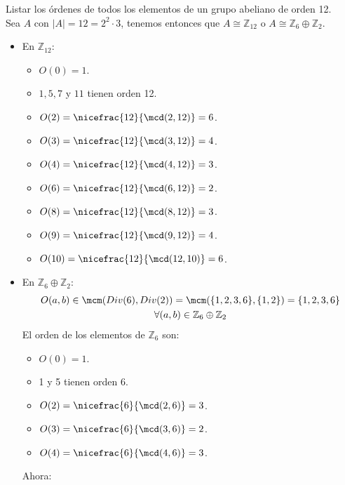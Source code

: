 \begin{ejemplo}
    Listar los órdenes de todos los elementos de un grupo abeliano de orden 12.\\

    \noindent
    Sea $A$ con $|A| = 12 = 2^2\cdot 3$, tenemos entonces que $A\cong \mathbb{Z}_{12}$ o $A\cong \mathbb{Z}_6\oplus \mathbb{Z}_2$.
    \begin{itemize}
        \item En $\mathbb{Z}_{12}$:
            \begin{itemize}
                \item $O(0) = 1$.
                \item $1, 5, 7$ y $11$ tienen orden 12.
                \item $O(2) = \nicefrac{12}{\mcd(2,12)} = 6$.
                \item $O(3) = \nicefrac{12}{\mcd(3,12)} = 4$.
                \item $O(4) = \nicefrac{12}{\mcd(4,12)} = 3$.
                \item $O(6) = \nicefrac{12}{\mcd(6,12)} = 2$.
                \item $O(8) = \nicefrac{12}{\mcd(8,12)} = 3$.
                \item $O(9) = \nicefrac{12}{\mcd(9,12)} = 4$.
                \item $O(10) = \nicefrac{12}{\mcd(12,10)} = 6$.
            \end{itemize}
        \item En $\mathbb{Z}_6\oplus\mathbb{Z}_2$:
            \begin{multline*}
                O(a,b) \in  \mcm(Div(6), Div(2)) = \mcm(\{1,2,3,6\}, \{1,2\}) = \{1,2,3,6\} \\ \forall (a,b)\in \mathbb{Z}_6\oplus\mathbb{Z}_2
            \end{multline*}
            El orden de los elementos de $\mathbb{Z}_6$ son:
            \begin{itemize}
                \item $O(0) = 1$.
                \item 1 y 5 tienen orden 6.
                \item $O(2) = \nicefrac{6}{\mcd(2,6)} = 3$.
                \item $O(3) = \nicefrac{6}{\mcd(3,6)} = 2$.
                \item $O(4) = \nicefrac{6}{\mcd(4,6)} = 3$.
            \end{itemize}
            Ahora:

\end{itemize}
\end{ejemplo}
